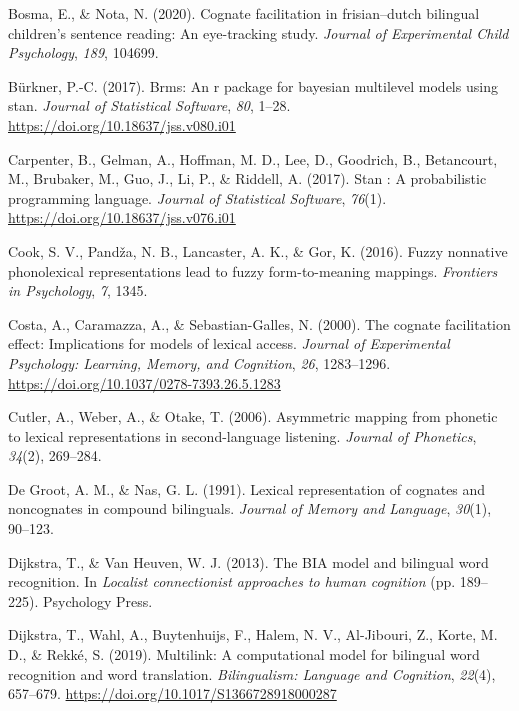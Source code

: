 \documentclass[
]{article}
\newlength{\cslhangindent}
\newlength{\cslentryspacingunit} %
\newenvironment{CSLReferences}[2] %
 {%
  \setlength{\parindent}{0pt}
  \ifodd #1
  \let\oldpar\par
  \def\par{\hangindent=\cslhangindent\oldpar}
  \fi
  \setlength{\parskip}{#2\cslentryspacingunit}
 }%
 {}
\begin{document}
\begin{CSLReferences}{1}{0}
\leavevmode{}%
Bosma, E., \& Nota, N. (2020). Cognate facilitation in frisian--dutch
bilingual children's sentence reading: An eye-tracking study.
\emph{Journal of Experimental Child Psychology}, \emph{189}, 104699.

\leavevmode{}%
Bürkner, P.-C. (2017). Brms: An r package for bayesian multilevel models
using stan. \emph{Journal of Statistical Software}, \emph{80}, 1--28.
\url{https://doi.org/10.18637/jss.v080.i01}

\leavevmode{}%
Carpenter, B., Gelman, A., Hoffman, M. D., Lee, D., Goodrich, B.,
Betancourt, M., Brubaker, M., Guo, J., Li, P., \& Riddell, A. (2017).
Stan : A probabilistic programming language. \emph{Journal of
Statistical Software}, \emph{76}(1).
\url{https://doi.org/10.18637/jss.v076.i01}

\leavevmode{}%
Cook, S. V., Pandža, N. B., Lancaster, A. K., \& Gor, K. (2016). Fuzzy
nonnative phonolexical representations lead to fuzzy form-to-meaning
mappings. \emph{Frontiers in Psychology}, \emph{7}, 1345.

\leavevmode{}%
Costa, A., Caramazza, A., \& Sebastian-Galles, N. (2000). The cognate
facilitation effect: Implications for models of lexical access.
\emph{Journal of Experimental Psychology: Learning, Memory, and
Cognition}, \emph{26}, 1283--1296.
\url{https://doi.org/10.1037/0278-7393.26.5.1283}

\leavevmode{}%
Cutler, A., Weber, A., \& Otake, T. (2006). Asymmetric mapping from
phonetic to lexical representations in second-language listening.
\emph{Journal of Phonetics}, \emph{34}(2), 269--284.

\leavevmode{}%
De Groot, A. M., \& Nas, G. L. (1991). Lexical representation of
cognates and noncognates in compound bilinguals. \emph{Journal of Memory
and Language}, \emph{30}(1), 90--123.

\leavevmode{}%
Dijkstra, T., \& Van Heuven, W. J. (2013). The BIA model and bilingual
word recognition. In \emph{Localist connectionist approaches to human
cognition} (pp. 189--225). Psychology Press.

\leavevmode{}%
Dijkstra, T., Wahl, A., Buytenhuijs, F., Halem, N. V., Al-Jibouri, Z.,
Korte, M. D., \& Rekké, S. (2019). Multilink: A computational model for
bilingual word recognition and word translation. \emph{Bilingualism:
Language and Cognition}, \emph{22}(4), 657--679.
\url{https://doi.org/10.1017/S1366728918000287}


\end{CSLReferences}
\end{document}
